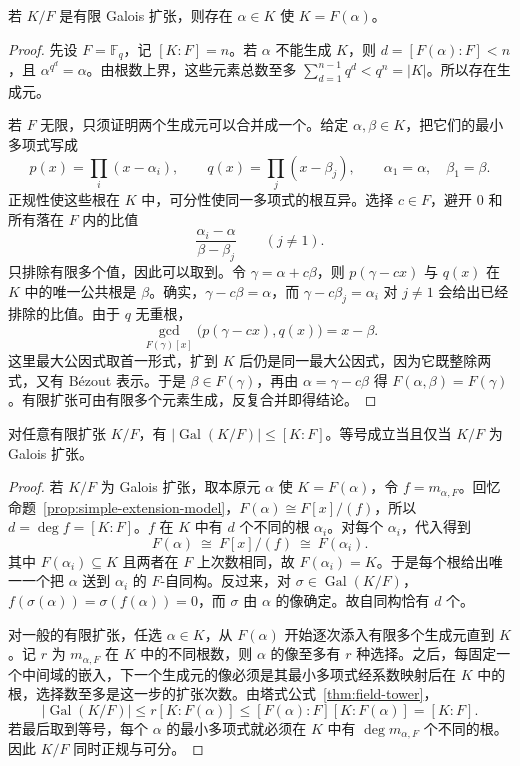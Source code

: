 \documentclass[lang=cn,a4paper,fontset=none,zihao=false,10pt,openany,twoside]{beautybook}
\numberwithin{algorithm}{chapter}
\begin{document}
\begin{proposition}\label{prop:galois-primitive}
若 $K/F$ 是有限 Galois 扩张，则存在 $\alpha\in K$ 使 $K=F(\alpha)$。
\end{proposition}
\begin{proof}
先设 $F=\mathbb F_q$，记 $[K:F]=n$。若 $\alpha$ 不能生成 $K$，则 $d=[F(\alpha):F]<n$，且 $\alpha^{q^d}=\alpha$。由根数上界，这些元素总数至多 $\sum_{d=1}^{n-1}q^d<q^n=|K|$。所以存在生成元。

若 $F$ 无限，只须证明两个生成元可以合并成一个。给定 $\alpha,\beta\in K$，把它们的最小多项式写成
\[
 p(x)=\prod_i(x-\alpha_i),\qquad q(x)=\prod_j(x-\beta_j),
 \qquad \alpha_1=\alpha,\quad \beta_1=\beta.
\]
正规性使这些根在 $K$ 中，可分性使同一多项式的根互异。选择 $c\in F$，避开 $0$ 和所有落在 $F$ 内的比值
\[
 \frac{\alpha_i-\alpha}{\beta-\beta_j}\qquad(j\ne1).
\]
只排除有限多个值，因此可以取到。令 $\gamma=\alpha+c\beta$，则 $p(\gamma-cx)$ 与 $q(x)$ 在 $K$ 中的唯一公共根是 $\beta$。确实，$\gamma-c\beta=\alpha$，而 $\gamma-c\beta_j=\alpha_i$ 对 $j\ne1$ 会给出已经排除的比值。由于 $q$ 无重根，
\[
 \gcd_{F(\gamma)[x]}\bigl(p(\gamma-cx),q(x)\bigr)=x-\beta.
\]
这里最大公因式取首一形式，扩到 $K$ 后仍是同一最大公因式，因为它既整除两式，又有 Bézout 表示。于是 $\beta\in F(\gamma)$，再由 $\alpha=\gamma-c\beta$ 得 $F(\alpha,\beta)=F(\gamma)$。有限扩张可由有限多个元素生成，反复合并即得结论。
\end{proof}

\begin{theorem}\label{thm:galois-order}
对任意有限扩张 $K/F$，有 $|\operatorname{Gal}(K/F)|\le [K:F]$。等号成立当且仅当 $K/F$ 为 Galois 扩张。
\end{theorem}
\begin{proof}
若 $K/F$ 为 Galois 扩张，取本原元 $\alpha$ 使 $K=F(\alpha)$，令 $f=m_{\alpha,F}$。回忆命题~\ref{prop:simple-extension-model}，$F(\alpha)\cong F[x]/(f)$，所以 $d=\deg f=[K:F]$。$f$ 在 $K$ 中有 $d$ 个不同的根 $\alpha_i$。对每个 $\alpha_i$，代入得到
\[
 F(\alpha)\ \cong\ F[x]/(f)\ \cong\ F(\alpha_i).
\]
其中 $F(\alpha_i)\subseteq K$ 且两者在 $F$ 上次数相同，故 $F(\alpha_i)=K$。于是每个根给出唯一一个把 $\alpha$ 送到 $\alpha_i$ 的 $F$-自同构。反过来，对 $\sigma\in\operatorname{Gal}(K/F)$，$f(\sigma(\alpha))=\sigma(f(\alpha))=0$，而 $\sigma$ 由 $\alpha$ 的像确定。故自同构恰有 $d$ 个。

对一般的有限扩张，任选 $\alpha\in K$，从 $F(\alpha)$ 开始逐次添入有限多个生成元直到 $K$。记 $r$ 为 $m_{\alpha,F}$ 在 $K$ 中的不同根数，则 $\alpha$ 的像至多有 $r$ 种选择。之后，每固定一个中间域的嵌入，下一个生成元的像必须是其最小多项式经系数映射后在 $K$ 中的根，选择数至多是这一步的扩张次数。由塔式公式~\ref{thm:field-tower}，
\[
 |\operatorname{Gal}(K/F)|
 \le r[K:F(\alpha)]\le [F(\alpha):F][K:F(\alpha)]=[K:F].
\]
若最后取到等号，每个 $\alpha$ 的最小多项式就必须在 $K$ 中有 $\deg m_{\alpha,F}$ 个不同的根。因此 $K/F$ 同时正规与可分。
\end{proof}
\end{document}

